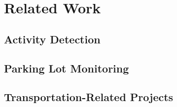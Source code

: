 \section{Related Work}
\label{sec-related}

\subsection{Activity Detection}

\subsection{Parking Lot Monitoring}

\subsection{Transportation-Related Projects}

